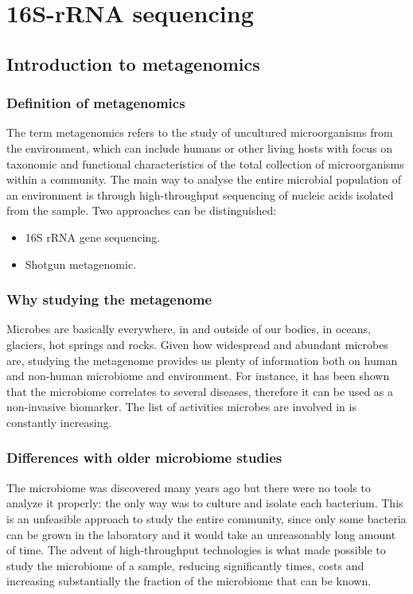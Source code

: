 \graphicspath{{chapters/images/07/}}
\chapter{16S-rRNA sequencing}

\section{Introduction to metagenomics}

  \subsection{Definition of metagenomics}
   The term metagenomics refers to the study of uncultured microorganisms from the environment, which can include humans or other living hosts with focus on taxonomic and functional characteristics of the total collection of microorganisms within a community.
   The main way to analyse the entire microbial population of an environment is through high-throughput sequencing of nucleic acids isolated from the sample.
   Two approaches can be distinguished:

   \begin{multicols}{2}
     \begin{itemize}
       \item 16S rRNA gene sequencing.
         \item Shotgun metagenomic.
     \end{itemize}
   \end{multicols}

  \subsection{Why studying the metagenome}
   Microbes are basically everywhere, in and outside of our bodies, in oceans, glaciers, hot springs and rocks.
   Given how widespread and abundant microbes are, studying the metagenome provides us plenty of information both on human and non-human microbiome and environment.
   For instance, it has been shown that the microbiome correlates to several diseases, therefore it can be used as a non-invasive biomarker.
   The list of activities microbes are involved in is constantly increasing.

  \subsection{Differences with older microbiome studies}
  The microbiome was discovered many years ago but there were no tools to analyze it properly: the only way was to culture and isolate each bacterium.
  This is an unfeasible approach to study the entire community, since only some bacteria can be grown in the laboratory and it would take an unreasonably long amount of time.
  The advent of high-throughput technologies is what made possible to study the microbiome of a sample, reducing significantly times, costs and increasing substantially the fraction of the microbiome that can be known.

